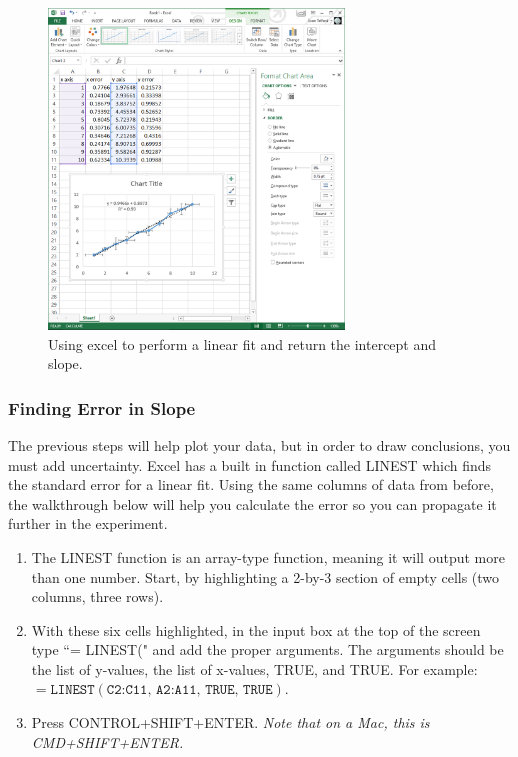 \begin{figure}[h!]
\centering
\includegraphics[height=0.4\textheight, width = 0.7\textwidth]{./Exp1-2/pic/image6.png}
\caption{Using excel to perform a linear fit and return the intercept and slope.}
\label{fig:excel3}
\end{figure}

\subsubsection{Finding Error in Slope}
\label{sec:linest}

The previous steps will help plot your data, but in order to draw conclusions, you must add uncertainty. Excel has a built in function called LINEST which finds the standard error for a linear fit. Using the same columns of data from before, the walkthrough below will help you calculate the error so you can propagate it further in the experiment.

\begin{enumerate}
\item The LINEST function is an array-type function, meaning it will output more than one number. Start, by highlighting a 2-by-3 section of empty cells (two columns, three rows).
\item With these six cells highlighted, in the input box at the top of the screen type ``= LINEST(" and add the proper arguments. The arguments should be the list of y-values, the list of x-values, TRUE, and TRUE.
For example:
$=\texttt{LINEST}(\texttt{C2:C11, A2:A11, TRUE, TRUE})$.

\item Press CONTROL+SHIFT+ENTER. \it{Note that on a Mac, this is CMD+SHIFT+ENTER.}
\end{enumerate}

